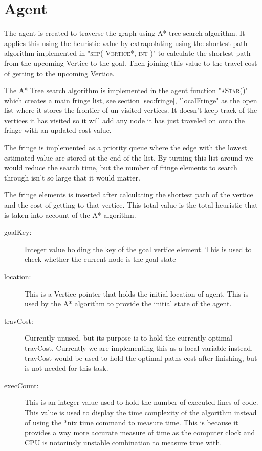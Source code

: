 \section{Agent}
The agent is created to traverse the graph using A* tree search algorithm. It
applies this using the heuristic value by extrapolating using the shortest path
algorithm implemented in "\textsc{shp( Vertice*, int )}" to calculate the
shortest path from the upcoming Vertice to the goal. Then joining this value to 
the travel cost of getting to the upcoming Vertice.

The A* Tree search algorithm is implemented in the agent function
"\textsc{aStar()}" which creates a main fringe list, see section
\ref{sec:fringe}, "localFringe" as the open list
where it stores the frontier of un-visited vertices.  It doesn't keep track of
the vertices it has visited so it will add any node it has just traveled on onto
the fringe with an updated cost value.

The fringe is implemented as a priority queue where the edge with the lowest
estimated value are stored at the end of the list.  By turning this list around
we would reduce the search time, but the number of fringe elements to search
through isn't so large that it would matter.

The fringe elements is inserted after calculating the shortest path of the
vertice and the cost of getting to that vertice.  This total value is the total
heuristic that is taken into account of the A* algorithm.

\begin{description}
\item[goalKey:]		Integer value holding the key of the goal vertice element.
	This is used to check whether the current node is the goal state
\item[location:]	This is a Vertice pointer that holds the initial location of 
	agent.  This is used by the A* algorithm to provide the initial state of the
	agent.
\item[travCost:]	Currently unused, but its purpose is to hold the currently
	optimal travCost. Currently we are implementing this as a local variable
	instead.  travCost would be used to hold the optimal paths cost after
	finishing, but is not needed for this task.
\item[execCount:]	This is an integer value used to hold the number of executed
	lines of code. This value is used to display the time complexity of the
	algorithm instead of using the *nix time command to measure time.  This is
	because it provides a way more accurate measure of time as the computer clock
	and CPU is notoriusly unstable combination to measure time with.
\end{description}

